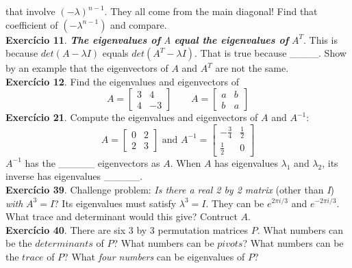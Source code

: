 \documentclass[12pt]{article}
\begin{document}
    that involve $(-\lambda)^{n-1}$. They all come from the main diagonal! Find that coefficient of $(-\lambda^{n-1})$ and compare.\\
    \newpage
    \noindent\textbf{Exercício 11}. \textit{\textbf{The eigenvalues of} A \textbf{equal the eigenvalues of}} $A^T$. This is because $det(A-\lambda I)$ equals $det(A^T-\lambda I)$. That is true because \_\_\_\_. Show by an example that the eigenvectors of $A$ and $A^T$ are not the same.\\
    \textbf{Exercício 12}.
    Find the eigenvalues and eigenvectors of 
    $$A = \left[\begin{matrix}
        3 & 4 \\
        4 & -3
    \end{matrix}\right]\quad \quad 
    A = \left[\begin{matrix}
        a & b \\
        b & a
    \end{matrix}\right]
    $$
    \textbf{Exercício 21}. Compute the eigenvalues and eigenvectors of $A$ and $A^{-1}$:
    $$A = 
    \left[
        \begin{matrix}
            0 & 2 \\
            2 & 3
        \end{matrix}    
    \right]\text{ and } 
    A^{-1} = 
    \left[
        \begin{matrix}
            -\frac{3}{4} & \frac{1}{2} \\
            \frac{1}{2} & 0
        \end{matrix}    
    \right]
    $$
    $A^{-1}$ has the \_\_\_\_\_ eigenvectors as $A$. When $A$ has eigenvalues $\lambda_1$ and $\lambda_2$, its inverse has eigenvalues \_\_\_\_\_.\\
    \textbf{Exercício 39}. Challenge problem: \textit{Is there a real 2 by 2 matrix} (other than \textit{I}) \textit{with} $A^3 = I$? Its eigenvalues must satisfy $\lambda^3 = I$. They can be $e^{2\pi i/3}$ and $e^{-2\pi i/3}$. What trace and determinant would this give? Contruct $A$.\\
    \textbf{Exercício 40}. There are six 3 by 3 permutation matrices $P$. What numbers can be the $determinants$ of $P$? What numbers can be $pivots$? What numbers can be the $trace$ of $P$? What \textit{four numbers} can be eigenvalues of $P$?
\end{document}
